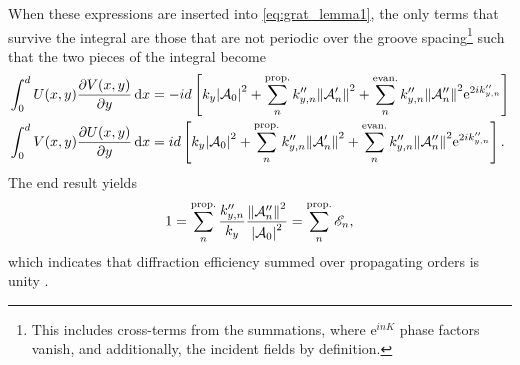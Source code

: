 When these expressions are inserted into \cref{eq:grat_lemma1}, the only terms that survive the integral are those that are not periodic over the groove spacing\footnote{This includes cross-terms from the summations, where $\mathrm{e}^{i n K}$ phase factors vanish, and additionally, the incident fields by definition.} such that the two pieces of the integral become
\begin{subequations}
\begin{align}
 \int_0^d U (x,y) \pdv{V (x,y)}{y} \dd{x} &= - i d \left[ k_y \abs{\mathcal{A}_0}^2 + \sum_{n}^{\text{prop.}} k_{y,n}'' \norm{\mathcal{A}_n'}^2 + \sum_{n}^{\text{evan.}} k_{y,n}'' \norm{\mathcal{A}_n''}^2 \mathrm{e}^{2 i k_{y,n}''} \right] \\
 \int_0^d V (x,y) \pdv{U (x,y)}{y} \dd{x} &= i d \left[ k_y \abs{\mathcal{A}_0}^2 + \sum_{n}^{\text{prop.}} k_{y,n}'' \norm{\mathcal{A}_n'}^2 + \sum_{n}^{\text{evan.}} k_{y,n}'' \norm{\mathcal{A}_n''}^2 \mathrm{e}^{2 i k_{y,n}''} \right] .
 \end{align}
\end{subequations}
The end result yields
\begin{equation}\label{eq:prop_order_unity}
 1 = \sum_{n}^{\text{prop.}} \frac{k_{y,n}''}{k_y} \frac{\norm{\mathcal{A}_n''}^2}{\abs{\mathcal{A}_0}^2} = \sum_{n}^{\text{prop.}} \mathscr{E}_n ,
 \end{equation}
which indicates that diffraction efficiency summed over propagating orders is unity \cite{Petit80}. 

